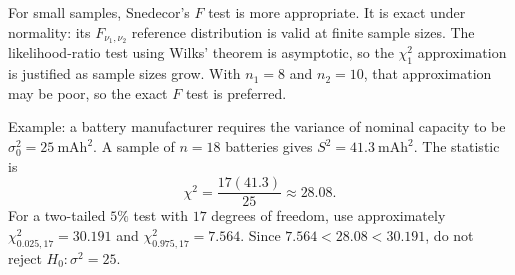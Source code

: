 \begin{solproblema}[prob:9db6e94]
For small samples, Snedecor's $F$ test is more appropriate. It is exact under normality: its $F_{\nu_1,\nu_2}$ reference distribution is valid at finite sample sizes. The likelihood-ratio test using Wilks' theorem is asymptotic, so the $\chi^2_1$ approximation is justified as sample sizes grow. With $n_1=8$ and $n_2=10$, that approximation may be poor, so the exact $F$ test is preferred.
\end{solproblema}

\begin{solproblema}[prob:a0ad324]
Example: a battery manufacturer requires the variance of nominal capacity to be $\sigma_0^2=25\ \text{mAh}^2$. A sample of $n=18$ batteries gives $S^2=41.3\ \text{mAh}^2$. The statistic is
\[
	\chi^2=\frac{17(41.3)}{25}\approx28.08.
\]
For a two-tailed $5\%$ test with $17$ degrees of freedom, use approximately $\chi^2_{0.025,17}=30.191$ and $\chi^2_{0.975,17}=7.564$. Since $7.564<28.08<30.191$, do not reject $H_0:\sigma^2=25$.
\end{solproblema}
